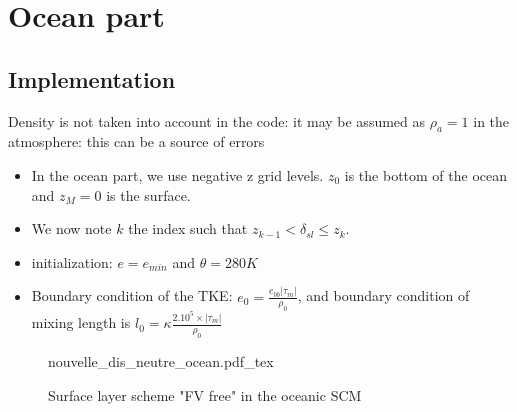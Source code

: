 \section{Ocean part}
\subsection{Implementation}
{\color{red} Density is not taken into account in the code:
it may be assumed as $\rho_a=1$ in the atmosphere: this can be
a source of errors}
\begin{itemize}
\item
In the ocean part, we use negative z grid levels.
$z_0$ is the bottom of the ocean and $z_{M}=0$ is the surface.
\item
We now note $k$ the index such that $z_{k-1} < \delta_{sl} \leq z_k$.
\item initialization: $e=e_{min}$ and $\theta = 280K$
\item Boundary condition of the TKE:
	$e_0=\frac{e_{bb}|\tau_m|}{\rho_0}$, and
	boundary condition of mixing length is
		$l_0 = \kappa \frac{2.10^5\times |\tau_m|}{\rho_0}$

\end{itemize}
\begin{figure}
	{nouvelle_dis_neutre_ocean.pdf_tex}
	\caption{Surface layer scheme "FV free" in the oceanic SCM}
	\label{fig:ND_Ocean_nouvelle_dis_neutre}
\end{figure}


